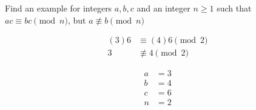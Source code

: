 \documentclass[12pt]{article} %
\begin{document}
\pagebreak

\begin{homeworkProblem}
    \begin{grayBoxed}
        Find an example for integers $a, b, c$ and an integer $n \geq 1$ such that
        $ac \equiv bc \pmod{n}$, but $a \not \equiv b \pmod{n}$
    \end{grayBoxed}

    \begin{align*}
        (3)6 & \equiv (4)6 \pmod{2}   \\
        3    & \not \equiv 4 \pmod{2}
    \end{align*}

    \begin{align*}
        a & = 3 \\
        b & = 4 \\
        c & = 6 \\
        n & = 2
    \end{align*}

\end{homeworkProblem}

\pagebreak
\end{document}
